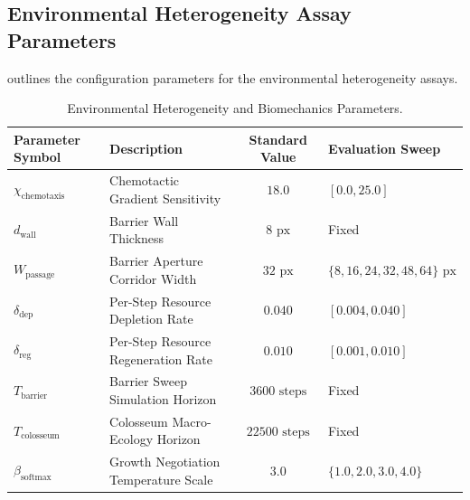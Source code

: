 \subsection{Environmental Heterogeneity Assay Parameters}
\label{subsec:app_param_environmental}

 outlines the configuration parameters for the environmental heterogeneity assays.

\begin{table}[htbp]
\centering
\footnotesize
\caption{Environmental Heterogeneity and Biomechanics Parameters.}
\label{tab:app_env_hyperparams}
\begin{tabularx}{\textwidth}{l X c p{3.8cm}}
\toprule
\textbf{Parameter Symbol} & \textbf{Description} & \textbf{Standard Value} & \textbf{Evaluation Sweep} \\
\midrule
$\chi_{\text{chemotaxis}}$ & Chemotactic Gradient Sensitivity & $18.0$ & $[0.0, 25.0]$ \\
$d_{\text{wall}}$ & Barrier Wall Thickness & $8\text{ px}$ & Fixed \\
$W_{\text{passage}}$ & Barrier Aperture Corridor Width & $32\text{ px}$ & $\{8, 16, 24, 32, 48, 64\}\text{ px}$ \\
$\delta_{\text{dep}}$ & Per-Step Resource Depletion Rate & $0.040$ & $[0.004, 0.040]$ \\
$\delta_{\text{reg}}$ & Per-Step Resource Regeneration Rate & $0.010$ & $[0.001, 0.010]$ \\
$T_{\text{barrier}}$ & Barrier Sweep Simulation Horizon & $3600\text{ steps}$ & Fixed \\
$T_{\text{colosseum}}$ & Colosseum Macro-Ecology Horizon & $22500\text{ steps}$ & Fixed \\
$\beta_{\text{softmax}}$ & Growth Negotiation Temperature Scale & $3.0$ & $\{1.0, 2.0, 3.0, 4.0\}$ \\
\bottomrule
\end{tabularx}
\end{table}